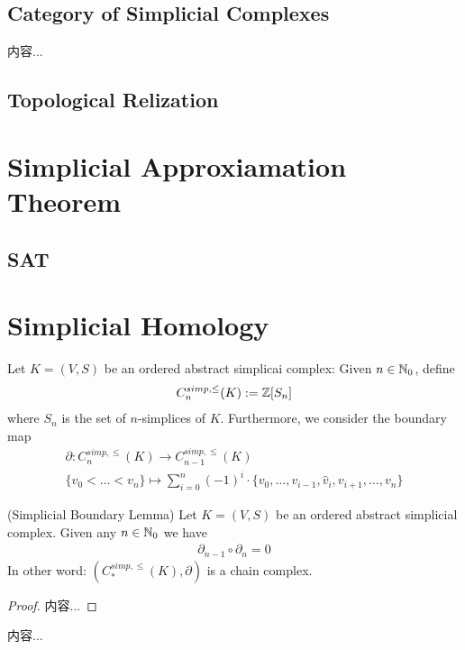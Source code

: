\documentclass[Total.tex]{subfiles}
\begin{document}
			\subsection{Category of Simplicial Complexes}
				\begin{Def}
					内容...
				\end{Def}
			\subsection{Topological Relization}
		\section{Simplicial Approxiamation Theorem}
			\subsection{SAT}
		\section{Simplicial Homology}
			\begin{Def}
				Let $K=(V,S)$ be an ordered abstract simplicai complex: Given $n\in \mathbb{N}_0$, define
				\begin{gather*}
					C_n^{simp,\leq}(K):=\mathbb{Z}[S_n]
				\end{gather*}
				where $S_n$ is the set of $n$-simplices of $K$. Furthermore, we consider the boundary map
				\begin{gather*}
					\partial:C_n^{simp,\leq}(K)\rightarrow C_{n-1}^{simp,\leq}(K)\\
					\{v_0<\dots<v_n\}\mapsto \sum_{i=0}^n (-1)^i\cdot \{v_0,\dots,v_{i-1},\hat{v}_i,v_{i+1},\dots,v_n\}
				\end{gather*}
			\end{Def}
			
			\begin{lemma}
				(Simplicial Boundary Lemma) Let $K=(V,S)$ be an ordered abstract simplicial complex. Given any $n\in \mathbb{N}_0$ we have
				\begin{gather*}
					\partial_{n-1}\circ \partial_n=0
				\end{gather*}
				In other word: $(C_*^{simp,\leq}(K),\partial)$ is a chain complex.
			\end{lemma}
			\begin{proof}
				内容...
			\end{proof}
			\begin{Def}
				内容...
			\end{Def}
			
\end{document}

